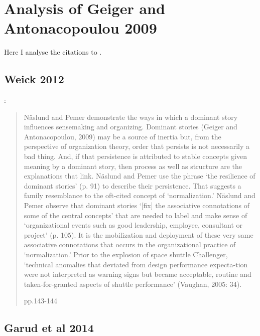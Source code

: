 \section{Analysis of Geiger and Antonacopoulou 2009}

Here I analyse the citations to \cite{geiger2009narratives}.\\

\subsection{Weick 2012}

\cite{weick2012organized}:
\begin{quote}
N\"{a}slund  and  Pemer  demonstrate  the  ways  in  which  a  dominant  story  influences sensemaking and organizing. Dominant stories (Geiger and Antonacopoulou, 2009) may be a source of inertia but, from the perspective of organization theory, order that persists is  not  necessarily  a  bad  thing.  And,  if  that  persistence  is  attributed  to  stable  concepts given meaning by a dominant story, then process as well as structure are the explanations that link. N\"{a}slund and Pemer use the phrase ‘the resilience of dominant stories’ (p. 91) to describe their persistence. That suggests a family resemblance to the oft-cited concept of ‘normalization.’ N\"{a}slund and Pemer observe that dominant stories ‘[fix] the associative connotations of some of the central concepts’ that are needed to label and make sense of ‘organizational events such as good leadership, employee, consultant or project’ (p. 105). It is the mobilization and deployment of these very same associative connotations that occurs in the organizational practice of ‘normalization.’ Prior to the explosion of space shuttle Challenger, ‘technical anomalies that deviated from design performance expecta-tion were not interpreted as warning signs but became acceptable, routine and taken-for-granted aspects of shuttle performance’ (Vaughan, 2005: 34).\\
\begin{flushright}
pp.143-144
\end{flushright}
\end{quote}

\subsection{Garud et al 2014}

